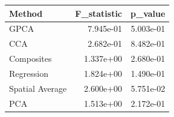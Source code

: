\begin{tabular}{lrr}
\toprule
Method & F_statistic & p_value \\
\midrule
GPCA & 7.945e-01 & 5.003e-01 \\
CCA & 2.682e-01 & 8.482e-01 \\
Composites & 1.337e+00 & 2.680e-01 \\
Regression & 1.824e+00 & 1.490e-01 \\
Spatial Average & 2.600e+00 & 5.751e-02 \\
PCA & 1.513e+00 & 2.172e-01 \\
\bottomrule
\end{tabular}
